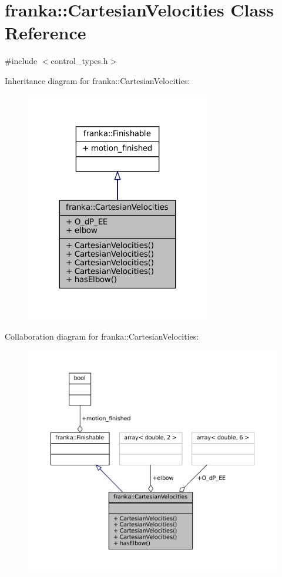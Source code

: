 \hypertarget{classfranka_1_1CartesianVelocities}{}\section{franka\+:\+:Cartesian\+Velocities Class Reference}
\label{classfranka_1_1CartesianVelocities}


{\ttfamily \#include $<$control\+\_\+types.\+h$>$}



Inheritance diagram for franka\+:\+:Cartesian\+Velocities\+:
\nopagebreak
\begin{figure}[H]
\begin{center}
\leavevmode
\includegraphics[width=228pt]{classfranka_1_1CartesianVelocities__inherit__graph}
\end{center}
\end{figure}


Collaboration diagram for franka\+:\+:Cartesian\+Velocities\+:
\nopagebreak
\begin{figure}[H]
\begin{center}
\leavevmode
\includegraphics[width=350pt]{classfranka_1_1CartesianVelocities__coll__graph}
\end{center}
\end{figure}
